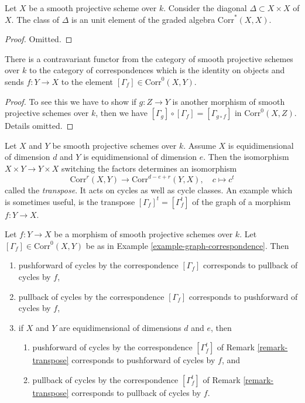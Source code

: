 \begin{lemma}
\label{lemma-identity-correspondence}
Let $X$ be a smooth projective scheme over $k$. Consider the diagonal
$\Delta \subset X \times X$ of $X$. The class of $\Delta$ is an
unit element of the graded algebra $\text{Corr}^*(X, X)$.
\end{lemma}

\begin{proof}
Omitted.
\end{proof}

\begin{lemma}
\label{lemma-contravariant-functor}
There is a contravariant functor from the category of smooth
projective schemes over $k$ to the category of correspondences
which is the identity on objects and sends $f : Y \to X$ to
the element $[\Gamma_f] \in \text{Corr}^0(X, Y)$.
\end{lemma}

\begin{proof}
To see this we have to show if $g : Z \to Y$ is another morphism of
smooth projective schemes over $k$, then we have
$[\Gamma_g] \circ [\Gamma_f] = [\Gamma_{g \circ f}]$ in
$\text{Corr}^0(X, Z)$. Details omitted.
\end{proof}

\begin{remark}
\label{remark-transpose}
Let $X$ and $Y$ be smooth projective schemes over $k$.
Assume $X$ is equidimensional of dimension $d$ and
$Y$ is equidimensional of dimension $e$. Then the isomorphism
$X \times Y \to Y \times X$ switching the factors determines
an isomorphism
$$
\text{Corr}^r(X, Y) \longrightarrow \text{Corr}^{d - e + r}(Y, X),\quad
c \longmapsto c^t
$$
called the {\it transpose}. It acts on cycles as well as cycle classes.
An example which is sometimes useful, is the transpose
$[\Gamma_f]^t = [\Gamma_f^t]$ of the graph of a morphism $f : Y \to X$.
\end{remark}

\begin{lemma}
\label{lemma-functor-and-cycles}
Let $f : Y \to X$ be a morphism of smooth projective schemes over $k$.
Let $[\Gamma_f] \in \text{Corr}^0(X, Y)$ be as in
Example \ref{example-graph-correspondence}. Then
\begin{enumerate}
\item pushforward of cycles by the correspondence $[\Gamma_f]$
corresponds to pullback of cycles by $f$,
\item pullback of cycles by the correspondence $[\Gamma_f]$
corresponds to pushforward of cycles by $f$,
\item if $X$ and $Y$ are equidimensional of dimensions $d$ and $e$,
then
\begin{enumerate}
\item pushforward of cycles by the correspondence
$[\Gamma_f^t]$ of Remark \ref{remark-transpose}
corresponds to pushforward of cycles by $f$, and
\item pullback of cycles by the correspondence
$[\Gamma_f^t]$ of Remark \ref{remark-transpose}
corresponds to pullback of cycles by $f$.
\end{enumerate}
\end{enumerate}
\end{lemma}

